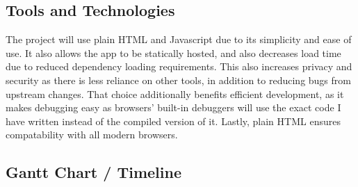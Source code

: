 \documentclass[14pt]{article}
\begin{document}
\subsection{Tools and Technologies}
The project will use plain HTML and Javascript due to its simplicity and ease of use. It also allows the app to be statically hosted, and also decreases load time due to reduced dependency loading requirements. This also increases privacy and security as there is less reliance on other tools, in addition to reducing bugs from upstream changes.
That choice additionally benefits efficient development, as it makes debugging easy as browsers' built-in debuggers will use the exact code I have written instead of the compiled version of it. Lastly, plain HTML ensures compatability with all modern browsers.

\subsection{Gantt Chart / Timeline}
\end{document}
